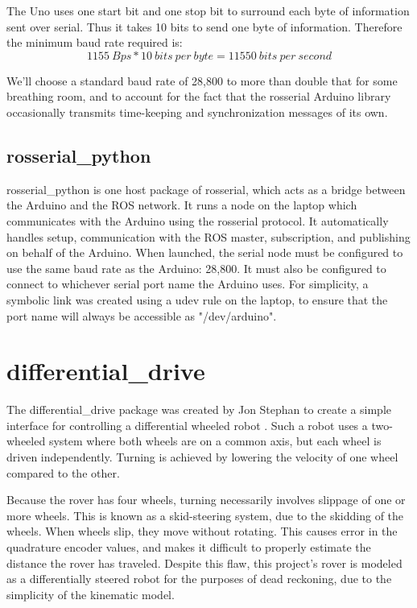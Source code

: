 The Uno uses one start bit and one stop bit to surround each byte of information sent over serial. Thus it takes 10 bits to send one byte of information. Therefore the minimum baud rate required is:
\[1155\ Bps * 10\ bits\ per\ byte = 11550\ bits\ per\ second\]

We'll choose a standard baud rate of 28,800 to more than double that for some breathing room, and to account for the fact that the rosserial Arduino library occasionally transmits time-keeping and synchronization messages of its own.

\subsection{rosserial\_python}
rosserial\_python is one host package of rosserial, which acts as a bridge between the Arduino and the ROS network. It runs a node on the laptop which communicates with the Arduino using the rosserial protocol. It automatically handles setup, communication with the ROS master, subscription, and publishing on behalf of the Arduino. When launched, the serial node must be configured to use the same baud rate as the Arduino: 28,800. It must also be configured to connect to whichever serial port name the Arduino uses. For simplicity, a symbolic link was created using a udev rule on the laptop, to ensure that the port name will always be accessible as "/dev/arduino". %

\section{differential\_drive}
The differential\_drive package was created by Jon Stephan to create a simple interface for controlling a differential wheeled robot \cite{}. Such a robot uses a two-wheeled system where both wheels are on a common axis, but each wheel is driven independently. Turning is achieved by lowering the velocity of one wheel compared to the other.

Because the rover has four wheels, turning necessarily involves slippage of one or more wheels. This is known as a skid-steering system, due to the skidding of the wheels. When wheels slip, they move without rotating. This causes error in the quadrature encoder values, and makes it difficult to properly estimate the distance the rover has traveled. Despite this flaw, this project's rover is modeled as a differentially steered robot for the purposes of dead reckoning, due to the simplicity of the kinematic model. 

